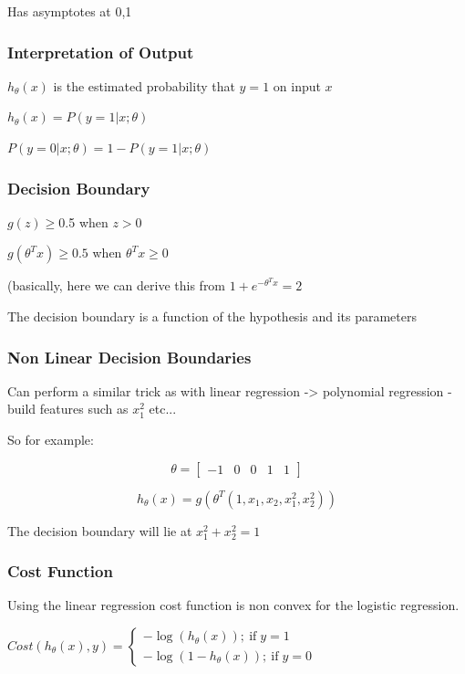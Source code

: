 Has  asymptotes at {0,1}

\subsubsection{Interpretation of Output}

$h_\theta(x)$ is the estimated probability that  $y=1$ on input $x$ 

$h_\theta(x) = P(y=1|x;\theta)$ 

$P(y=0|x;\theta) = 1-P(y=1|x;\theta)$

\subsubsection{Decision Boundary}

$g(z) \ge 0$.5 when $z>0$ 

$g(\theta^T x ) \ge 0.5$ when $\theta^Tx \ge 0$

(basically, here we  can derive this from $1+e^{-\theta^T x}  = 2$

The decision boundary is a function of the hypothesis and its parameters

\subsubsection{Non Linear Decision Boundaries}

Can perform a similar trick as with linear regression -> polynomial regression - build features such as $x_1^2$ etc...

So for example: 

$$\theta = \left[ \begin{matrix} -1 & 0 & 0  & 1 & 1 \end{matrix} \right]$$

$$h_\theta(x) = g(\theta^T(1,x_1,x_2,x_1^2,x_2^2 )) $$

The decision boundary will lie at $x_1^2 + x_2^2 = 1$

\subsubsection{Cost Function}

Using the linear regression cost function is non convex for the logistic regression.

$Cost(h_\theta(x),y) = \begin{cases} -\log(h_\theta(x))  ;\ \text{if} \;  y=1 \\ -\log(1-h_\theta(x))   ;\ \text{if} \;  y=0  \end{cases}$


